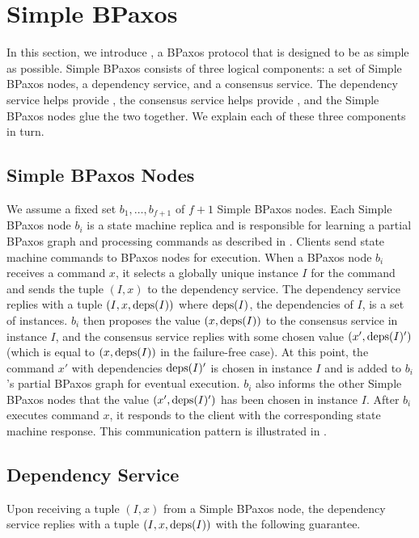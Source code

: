 \section{Simple BPaxos}
In this section, we introduce , a BPaxos protocol that
is designed to be as simple as possible.
%
Simple BPaxos consists of three logical components: a set of Simple BPaxos
nodes, a dependency service, and a consensus service. The dependency service
helps provide , the consensus service helps provide
, and the Simple BPaxos nodes glue the two together.
We explain each of these three components in turn.

\subsection{Simple BPaxos Nodes}

We assume a fixed set $b_1, \ldots, b_{f+1}$ of $f + 1$ Simple BPaxos nodes.
Each Simple BPaxos node $b_i$ is a state machine replica and is responsible for
learning a partial BPaxos graph and processing commands as described in
.
%
Clients send state machine commands to BPaxos nodes for execution. When a
BPaxos node $b_i$ receives a command $x$, it selects a globally unique instance
$I$ for the command and sends the tuple $(I, x)$ to the dependency service. The
dependency service replies with a tuple $(I, x, \text{deps}(I))$ where $\text{deps}(I)$,
the dependencies of $I$, is a set of instances.
%
$b_i$ then proposes the value $(x, \text{deps}(I))$ to the consensus service in
instance $I$, and the consensus service replies with some chosen value $(x',
\text{deps}(I)')$ (which is equal to $(x, \text{deps}(I))$ in the failure-free case). At
this point, the command $x'$ with dependencies $\text{deps}(I)'$ is chosen in instance
$I$ and is added to $b_i$'s partial BPaxos graph for eventual execution. $b_i$
also informs the other Simple BPaxos nodes that the value $(x', \text{deps}(I)')$ has
been chosen in instance $I$.
%
After $b_i$ executes command $x$, it responds to the client with the
corresponding state machine response.
%
This communication pattern is illustrated in .

\subsection{Dependency Service}
Upon receiving a tuple $(I, x)$ from a Simple BPaxos node, the dependency
service replies with a tuple $(I, x, \text{deps}(I))$ with the following guarantee.

